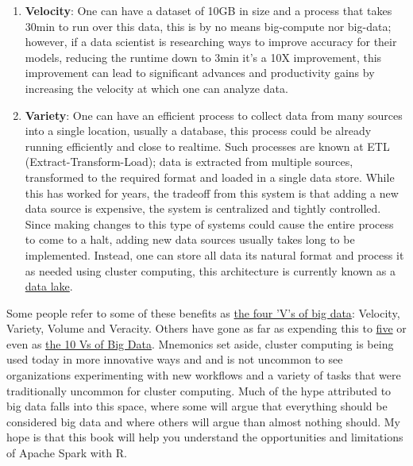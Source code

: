 \documentclass[]{book}
\theoremstyle{definition}
\theoremstyle{definition}
\theoremstyle{definition}
\theoremstyle{remark}
\begin{document}
\begin{enumerate}
\def\labelenumi{\arabic{enumi}.}
\item
  \textbf{Velocity}: One can have a dataset of 10GB in size and a
  process that takes 30min to run over this data, this is by no means
  big-compute nor big-data; however, if a data scientist is researching
  ways to improve accuracy for their models, reducing the runtime down
  to 3min it's a 10X improvement, this improvement can lead to
  significant advances and productivity gains by increasing the velocity
  at which one can analyze data.
\item
  \textbf{Variety}: One can have an efficient process to collect data
  from many sources into a single location, usually a database, this
  process could be already running efficiently and close to realtime.
  Such processes are known at ETL (Extract-Transform-Load); data is
  extracted from multiple sources, transformed to the required format
  and loaded in a single data store. While this has worked for years,
  the tradeoff from this system is that adding a new data source is
  expensive, the system is centralized and tightly controlled. Since
  making changes to this type of systems could cause the entire process
  to come to a halt, adding new data sources usually takes long to be
  implemented. Instead, one can store all data its natural format and
  process it as needed using cluster computing, this architecture is
  currently known as a
  \href{https://en.wikipedia.org/wiki/Data_lake}{data lake}.
\end{enumerate}

Some people refer to some of these benefits as
\href{http://www.theserverside.com/feature/Handling-the-four-Vs-of-big-data-volume-velocity-variety-and-veracity}{the
four 'V's of big data}: Velocity, Variety, Volume and Veracity. Others
have gone as far as expending this to
\href{https://en.wikipedia.org/wiki/Big_data}{five} or even as
\href{https://tdwi.org/articles/2017/02/08/10-vs-of-big-data.aspx}{the
10 Vs of Big Data}. Mnemonics set aside, cluster computing is being used
today in more innovative ways and and is not uncommon to see
organizations experimenting with new workflows and a variety of tasks
that were traditionally uncommon for cluster computing. Much of the hype
attributed to big data falls into this space, where some will argue that
everything should be considered big data and where others will argue
than almost nothing should. My hope is that this book will help you
understand the opportunities and limitations of Apache Spark with R.
\end{document}
